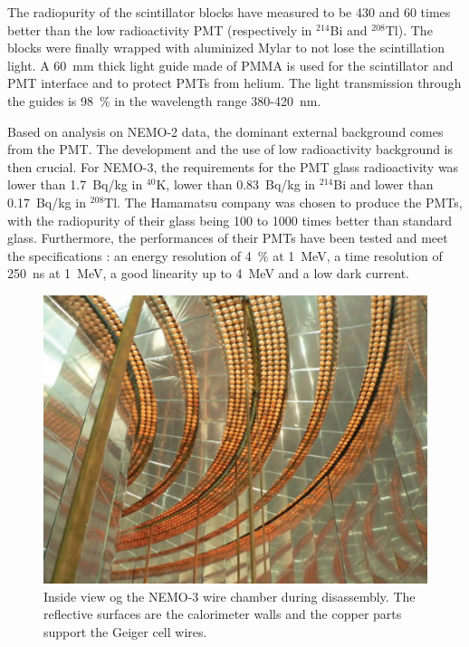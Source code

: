 \documentclass[main.tex]{subfiles}
\begin{document}
\bigskip


\NI The radiopurity of the scintillator blocks have measured to be 430 and 60 times better than the low radioactivity PMT (respectively in $^{\text{214}}$Bi and $^{\text{208}}$Tl). The blocks were finally wrapped with aluminized Mylar to not lose the scintillation light. A 60~mm thick light guide made of PMMA is used for the scintillator and PMT interface and to protect PMTs from helium. The light transmission through the guides is 98~\% in the wavelength range 380-420~nm.


\bigskip


\NI Based on analysis on NEMO-2 data, the dominant external background comes from the PMT. The development and the use of low radioactivity background is then crucial. For NEMO-3, the requirements for the PMT glass radioactivity was lower than 1.7~Bq/kg in $^{\text{40}}$K, lower than 0.83~Bq/kg in $^{\text{214}}$Bi and lower than 0.17~Bq/kg in $^{\text{208}}$Tl. The Hamamatsu company was chosen to produce the PMTs, with the radiopurity of their glass being 100 to 1000 times better than standard glass. Furthermore, the performances of their PMTs have been tested and meet the specifications : an energy resolution of 4~\% at 1~MeV, a time resolution of 250~ns at 1~MeV, a good linearity up to 4~MeV and a low dark current.  


\begin{figure}[h!]
\begin{center}
\includegraphics[scale=0.75]{pictures/Chap3/NEMO3Inside.jpg}
\caption{Inside view og the NEMO-3 wire chamber during disassembly. The reflective surfaces are the calorimeter walls and the copper parts support the Geiger cell wires.}
\label{NEMO3Inside}
\end{center}
\end{figure}
\end{document}
